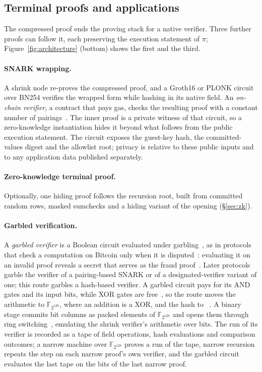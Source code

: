 \subsection{Terminal proofs and applications}
\label{sec:applications}

The compressed proof ends the proving stack for a native verifier. Three further proofs can follow it, each preserving the execution statement of $\pi$; Figure~\ref{fig:architecture} (bottom) shows the first and the third.

\paragraph{SNARK wrapping.} A shrink node re-proves the compressed proof, and a Groth16 or PLONK circuit over BN254 verifies the wrapped form while hashing in its native field. An \emph{on-chain verifier}, a contract that pays gas, checks the resulting proof with a constant number of pairings~\citep{groth16,plonk}. The inner proof is a private witness of that circuit, so a zero-knowledge instantiation hides it beyond what follows from the public execution statement. The circuit exposes the guest-key hash, the committed-values digest and the allowlist root; privacy is relative to these public inputs and to any application data published separately.

\paragraph{Zero-knowledge terminal proof.} Optionally, one hiding proof follows the recursion root, built from committed random rows, masked sumchecks and a hiding variant of the \WHIR{} opening (\S\ref{sec:zk}).

\paragraph{Garbled verification.} A \emph{garbled verifier} is a Boolean circuit evaluated under garbling~\citep{yao86}, as in protocols that check a computation on Bitcoin only when it is disputed~\citep{bitvm}: evaluating it on an invalid proof reveals a secret that serves as the fraud proof~\citep{glock}. Later protocols~\citep{bitvm3,argo-mac,babe,mosaic} garble the verifier of a pairing-based SNARK or of a designated-verifier variant of one; this route garbles a hash-based verifier. A garbled circuit pays for its AND gates and its input bits, while XOR gates are free~\citep{free-xor,half-gates}, so the route moves the arithmetic to $\mathbb F_{2^{128}}$, where an addition is a XOR, and the hash to \Blake{}~\citep{blake3}. A binary stage commits bit columns as packed elements of $\mathbb F_{2^{128}}$ and opens them through ring switching~\citep{binius,fri-binius}, emulating the shrink verifier's \KB{} arithmetic over bits. The run of its verifier is recorded as a tape of field operations, hash evaluations and comparison outcomes; a narrow machine over $\mathbb F_{2^{128}}$ proves a run of the tape, narrow recursion repeats the step on each narrow proof's own verifier, and the garbled circuit evaluates the last tape on the bits of the last narrow proof.

